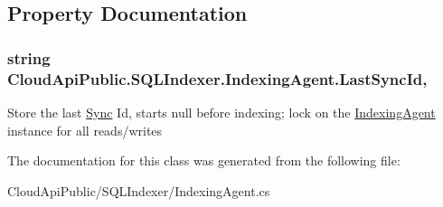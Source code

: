 \subsection{Property Documentation}
\hypertarget{class_cloud_api_public_1_1_s_q_l_indexer_1_1_indexing_agent_a9295f92ed5326ef6bda65d736574a82b}{
\subsubsection[{Last\-Sync\-Id}]{\setlength{\rightskip}{0pt plus 5cm}string Cloud\-Api\-Public.\-S\-Q\-L\-Indexer.\-Indexing\-Agent.\-Last\-Sync\-Id\hspace{0.3cm}{\ttfamily [get]}, {\ttfamily [set]}}}\label{class_cloud_api_public_1_1_s_q_l_indexer_1_1_indexing_agent_a9295f92ed5326ef6bda65d736574a82b}


Store the last \hyperlink{namespace_cloud_api_public_1_1_sync}{Sync} Id, starts null before indexing; lock on the \hyperlink{class_cloud_api_public_1_1_s_q_l_indexer_1_1_indexing_agent}{Indexing\-Agent} instance for all reads/writes 



The documentation for this class was generated from the following file\-:\begin{DoxyCompactItemize}
\item 
Cloud\-Api\-Public/\-S\-Q\-L\-Indexer/Indexing\-Agent.\-cs\end{DoxyCompactItemize}
